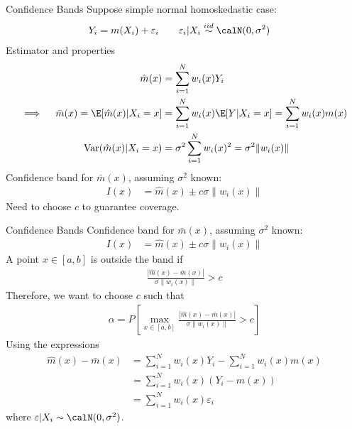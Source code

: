 \documentclass[aspectratio=169, handout]{beamer}
\newcommand{\iid}{\overset{iid}{\sim}}
\newcommand{\Var}{\operatorname{Var}}
\newcommand{\sumiN}{\sum^N_{i=1}}
\begin{document}
\begin{frame}[shrink]{Confidence Bands}
Suppose simple normal homoskedastic case:
\begin{align*}
  Y_i
  &=
  m(X_i)
  + \varepsilon_i
  \qquad
  \varepsilon_i|X_i\iid\calN(0,\sigma^2)
\end{align*}
Estimator and properties
\begin{align*}
  \hat{m}(x)
  &=
  \sum_{i=1}^N
  w_i(x) Y_i
  \\
  \implies\quad
  \bar{m}(x)
  =
  \E[\hat{m}(x)|X_i=x]
  &=
  \sum_{i=1}^N
  w_i(x) \E[Y|X_i=x]
  =
  \sum_{i=1}^N
  w_i(x) m(x)
  \\
  \Var(\hat{m}(x)|X_i=x)
  &=
  \sigma^2
  \sum_{i=1}^N
  w_i(x)^2
  =
  \sigma^2
  \lVert w_i(x)\rVert
\end{align*}
Confidence band for $\bar{m}(x)$, assuming $\sigma^2$ known:
\begin{align*}
  I(x)
  &=
  \hat{m}(x)
  \pm
  c\sigma \lVert w_i(x)\rVert
\end{align*}
Need to choose $c$ to guarantee coverage.
\end{frame}



\begin{frame}[shrink]{Confidence Bands}
Confidence band for $\bar{m}(x)$, assuming $\sigma^2$ known:
\begin{align*}
  I(x)
  &=
  \hat{m}(x)
  \pm
  c\sigma \lVert w_i(x)\rVert
\end{align*}
A point $x\in [a,b]$ is outside the band if
\begin{align*}
  \frac{|\hat{m}(x)-\bar{m}(x)|}{\sigma\lVert w_i(x)\rVert}
  > c
\end{align*}
Therefore, we want to choose $c$ such that
\begin{align*}
  \alpha =
  P\left[
  \max_{x\in [a,b]}
  \frac{|\hat{m}(x)-\bar{m}(x)|}{\sigma\lVert w_i(x)\rVert}
  > c
  \right]
\end{align*}
Using the expressions
\begin{align*}
  \hat{m}(x)-\bar{m}(x)
  &=
  \sumiN
  w_i(x)
  Y_i
  -
  \sumiN
  w_i(x)
  m(x)
  \\
  &=
  \sumiN
  w_i(x)
  (Y_i-m(x))
  \\
  &=
  \sumiN w_i(x) \varepsilon_i
\end{align*}
where $\varepsilon|X_i\sim \calN(0,\sigma^2)$.
\end{frame}
\end{document}
